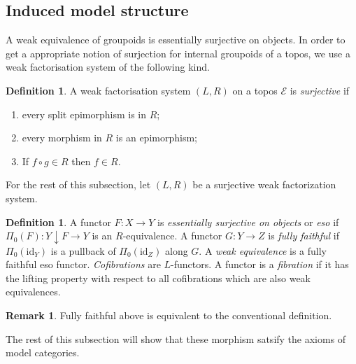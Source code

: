\documentclass{amsart}
\theoremstyle{plain}
\theoremstyle{definition}
\newtheorem{defin}[theorem]{Definition}
\newtheorem{remark}[theorem]{Remark}
\newcommand\hide[1]{}
\newcommand\cat\mathcal
\newcommand\id{\mathrm{id}}
\begin{document}
\subsection{Induced model structure}
A weak equivalence of groupoids is essentially surjective on objects. In order to get a appropriate notion of surjection for internal groupoids of a topos, we use a weak factorisation system of the following kind.

\begin{defin} A weak factorisation system $(L,R)$ on a topos $\cat E$ is \emph{surjective} if
\begin{enumerate}
\item every split epimorphism is in $R$;%
\item every morphism in $R$ is an epimorphism; %
\item If $f\circ g\in R$ then $f\in R$.
\end{enumerate}\label{surjective}
\end{defin}

For the rest of this subsection, let $(L,R)$ be a surjective weak factorization system.

\begin{defin} A functor $F:X\to Y$ is \emph{essentially surjective on objects} or \emph{eso} if $\Pi_0(F):Y\downarrow F\to Y$ is an $R$-equivalence. A functor $G:Y\to Z$ is \emph{fully faithful} if $\Pi_0(\id_Y)$ is a pullback of $\Pi_0(\id_Z)$ along $G$. A \emph{weak equivalence} is a fully faithful eso functor. \emph{Cofibrations} are $L$-functors. A functor is a \emph{fibration} if it has the lifting property with respect to all cofibrations which are also weak equivalences.\label{modstruc}
\end{defin}

\begin{remark} Fully faithful above is equivalent to the conventional definition. \end{remark}
\hide{ Dit moeten we ergens uitwerken. }

\hide{\begin{remark} A functor $F:X\to Y$ is fully faithful iff .
\[\xymatrix{
X\comma\id_X \ar[r]\ar[d]_{\Pi_0(\id_X)}\ar@{}[dr]|<\lrcorner & Y\comma\id_Y \ar[d]^{\Pi_0(\id_Y)} \\
X \ar[r]_F & Y
}\]\label{ff} \end{remark}}

The rest of this subsection will show that these morphism satsify the axioms of model categories.
\end{document}
